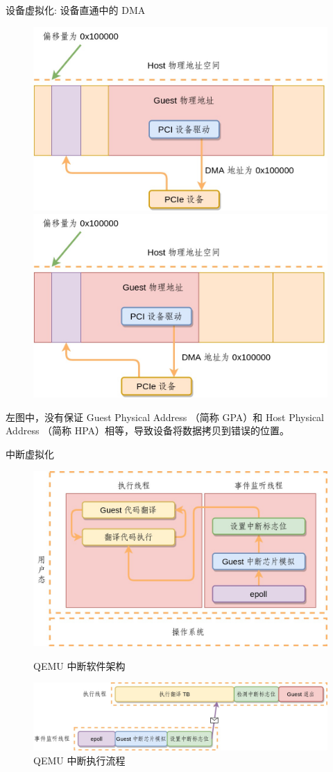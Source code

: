 \documentclass{beamer}
\begin{document}
\begin{frame}{设备虚拟化: 设备直通中的 DMA}
	\begin{figure}
		\includegraphics[width=0.48\linewidth]{../paper/images/bmbt-without-iommu.jpg}
		\hfill
		\includegraphics[width=0.48\linewidth]{../paper/images/bmbt-without-iommu2.jpg}
	\end{figure}
	左图中，没有保证 Guest Physical Address （简称 GPA）和 Host Physical Address （简称 HPA）相等，导致设备将数据拷贝到错误的位置。
\end{frame}

\begin{frame}{中断虚拟化}
	\begin{figure}
		\includegraphics[width=0.5\linewidth]{../paper/images/qemu-interrupt.jpg}
		\caption{QEMU 中断软件架构}
		\includegraphics[width=1.0\linewidth]{../paper/images/qemu-interrupt-codeflow.jpg}
		\caption{QEMU 中断执行流程}
	\end{figure}
\end{frame}
\end{document}
